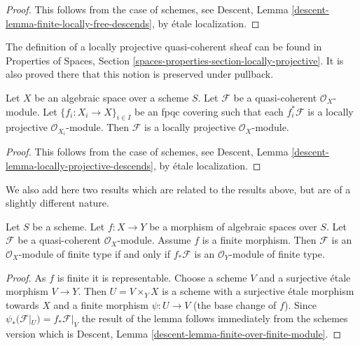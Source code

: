 \begin{proof}
This follows from the case of schemes, see
Descent, Lemma \ref{descent-lemma-finite-locally-free-descends},
by \'etale localization.
\end{proof}

\noindent
The definition of a locally projective quasi-coherent sheaf can be found in
Properties of Spaces, Section
\ref{spaces-properties-section-locally-projective}.
It is also proved there that this notion is preserved under pullback.

\begin{lemma}
\label{lemma-locally-projective-descends}
Let $X$ be an algebraic space over a scheme $S$.
Let $\mathcal{F}$ be a quasi-coherent $\mathcal{O}_X$-module.
Let $\{f_i : X_i \to X\}_{i \in I}$ be an fpqc covering such that
each $f_i^*\mathcal{F}$ is a locally projective $\mathcal{O}_{X_i}$-module.
Then $\mathcal{F}$ is a locally projective $\mathcal{O}_X$-module.
\end{lemma}

\begin{proof}
This follows from the case of schemes, see
Descent, Lemma \ref{descent-lemma-locally-projective-descends},
by \'etale localization.
\end{proof}

\noindent
We also add here two results which are related to the results above, but
are of a slightly different nature.

\begin{lemma}
\label{lemma-finite-over-finite-module}
Let $S$ be a scheme.
Let $f : X \to Y$ be a morphism of algebraic spaces over $S$.
Let $\mathcal{F}$ be a quasi-coherent $\mathcal{O}_X$-module.
Assume $f$ is a finite morphism.
Then $\mathcal{F}$ is an $\mathcal{O}_X$-module of finite type
if and only if $f_*\mathcal{F}$ is an $\mathcal{O}_Y$-module of finite
type.
\end{lemma}

\begin{proof}
As $f$ is finite it is representable. Choose a scheme $V$ and a surjective
\'etale morphism $V \to Y$. Then $U = V \times_Y X$ is a scheme with
a surjective \'etale morphism towards $X$ and a finite morphism
$\psi : U \to V$ (the base change of $f$). Since
$\psi_*(\mathcal{F}|_U) = f_*\mathcal{F}|_V$
the result of the lemma follows immediately from the schemes version which
is
Descent, Lemma \ref{descent-lemma-finite-over-finite-module}.
\end{proof}

